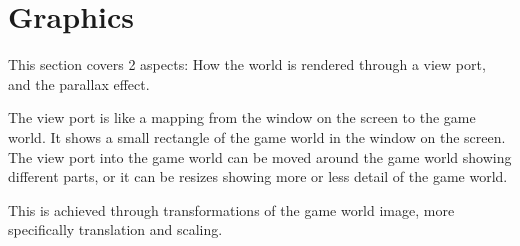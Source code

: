 \section{Graphics}
This section covers 2 aspects: How the world is rendered through a view port, and the parallax effect.

The view port is like a mapping from the window on the screen to the game world.
It shows a small rectangle of the game world in the window on the screen.
The view port into the game world can be moved around the game world showing different parts, or it can be resizes showing more or less detail of the game world.

This is achieved through transformations of the game world image, more specifically translation and scaling.


